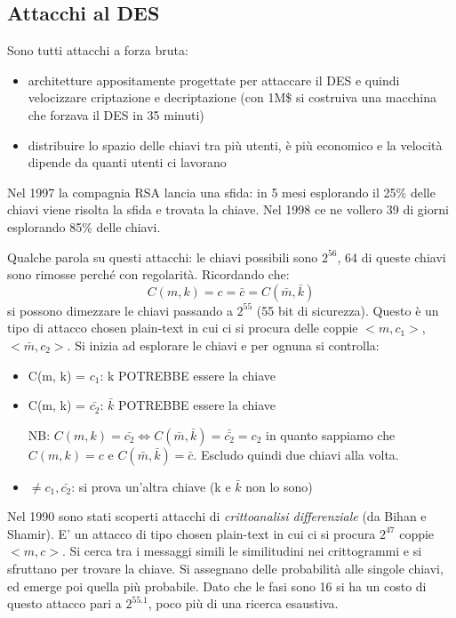 \subsection{Attacchi al DES}
Sono tutti attacchi a forza bruta:
\begin{itemize}
    \item architetture appositamente progettate per attaccare il DES e quindi velocizzare criptazione e decriptazione (con 1M\$ si costruiva una macchina che forzava il DES in 35 minuti)
    \item distribuire lo spazio delle chiavi tra più utenti, è più economico e la velocità dipende da quanti utenti ci lavorano
\end{itemize}

Nel 1997 la compagnia RSA lancia una sfida: in 5 mesi esplorando il 25\% delle chiavi viene risolta la sfida e trovata la chiave.
Nel 1998 ce ne vollero 39 di giorni esplorando 85\% delle chiavi.

Qualche parola su questi attacchi: le chiavi possibili sono $2^{56}$, 64 di queste chiavi sono rimosse perché con regolarità. Ricordando che:
$$ C(m, k) = c = \bar{c} = C(\bar{m}, \bar{k}) $$
si possono dimezzare le chiavi passando a $2^{55}$ (55 bit di sicurezza). Questo è un tipo di attacco chosen plain-text in cui ci si procura delle coppie $<m, c_1>$, $<\bar{m}, c_2>$. Si inizia ad esplorare le chiavi e per ognuna si controlla:
\begin{itemize}
    \item C(m, k) = $c_1$: k POTREBBE essere la chiave
    \item C(m, k) = $\bar{c_2}$: $\bar{k}$ POTREBBE essere la chiave
    
    NB: $C(m,k) = \bar{c_2} \iff C(\bar{m},\bar{k}) = \bar{\bar{c_2}} = c_2$ in quanto sappiamo che $C(m, k) = c$ e $C(\bar{m}, \bar{k})=\bar{c}$. Escludo quindi due chiavi alla volta.
    \item $\neq c_1, \bar{c_2}$: si prova un'altra chiave (k e $\bar{k}$ non lo sono)
\end{itemize}

Nel 1990 sono stati scoperti attacchi di \emph{crittoanalisi differenziale} (da Bihan e Shamir). E' un attacco di tipo chosen plain-text in cui ci si procura $2^{47}$ coppie $<m,c>$.
Si cerca tra i messaggi simili le similitudini nei crittogrammi e si sfruttano per trovare la chiave.
Si assegnano delle probabilità alle singole chiavi, ed emerge poi quella più probabile.
Dato che le fasi sono 16 si ha un costo di questo attacco pari a $2^{55.1}$, poco più di una ricerca esaustiva.


